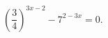 \begin{ex}[type=equation]
	\begin{condition}
		$\left(\dfrac{3}{4}\right)^{3x - 2} - 7^{2 - 3x} = 0.$
	\end{condition}
\end{ex}